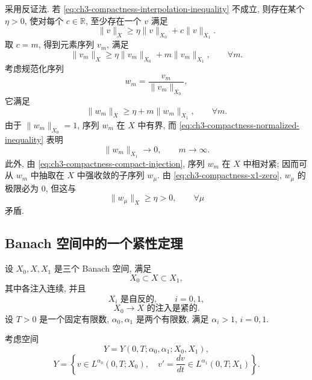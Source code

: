 \begin{Proof}
采用反证法. 若 \eqref{eq:ch3-compactness-interpolation-inequality} 不成立, 则存在某个 $\eta>0$, 使对每个 $c\in\mathbb R$, 至少存在一个 $v$ 满足
\[
\lVert v\rVert_X\geq \eta\lVert v\rVert_{X_0}+c\lVert v\rVert_{X_1}.
\]
取 $c=m$, 得到元素序列 $v_m$, 满足
\[
\lVert v_m\rVert_X\geq \eta\lVert v_m\rVert_{X_0}+m\lVert v_m\rVert_{X_1},
\qquad\forall m.
\]
考虑规范化序列
\[
w_m=\frac{v_m}{\lVert v_m\rVert_{X_0}},
\]
它满足
\begin{equation}
\lVert w_m\rVert_X\geq\eta+m\lVert w_m\rVert_{X_1},
\qquad\forall m.
\label{eq:ch3-compactness-normalized-inequality}
\end{equation}
由于 $\lVert w_m\rVert_{X_0}=1$, 序列 $w_m$ 在 $X$ 中有界, 而 \eqref{eq:ch3-compactness-normalized-inequality} 表明
\begin{equation}
\lVert w_m\rVert_{X_1}\longrightarrow0,
\qquad m\to\infty.
\label{eq:ch3-compactness-x1-zero}
\end{equation}
此外, 由 \eqref{eq:ch3-compactness-compact-injection}, 序列 $w_m$ 在 $X$ 中相对紧; 因而可从 $w_m$ 中抽取在 $X$ 中强收敛的子序列 $w_\mu$. 由 \eqref{eq:ch3-compactness-x1-zero}, $w_\mu$ 的极限必为 $0$, 但这与
\[
\lVert w_\mu\rVert_X\geq\eta>0,
\qquad\forall\mu
\]
矛盾.
\end{Proof}

\subsection{Banach 空间中的一个紧性定理}
\label{subsec:ch3-compactness-banach}
设 $X_0,X,X_1$ 是三个 Banach 空间, 满足
\begin{equation}
X_0\subset X\subset X_1,
\label{eq:ch3-compactness-banach-chain}
\end{equation}
其中各注入连续, 并且
\begin{equation}
X_i\text{ 是自反的},\qquad i=0,1,
\label{eq:ch3-compactness-reflexive-spaces}
\end{equation}
\begin{equation}
X_0\longrightarrow X\text{ 的注入是紧的}.
\label{eq:ch3-compactness-banach-compact-injection}
\end{equation}
设 $T>0$ 是一个固定有限数, $\alpha_0,\alpha_1$ 是两个有限数, 满足 $\alpha_i>1$, $i=0,1$.

考虑空间
\begin{equation}
Y=Y(0,T;\alpha_0,\alpha_1;X_0,X_1),
\label{eq:ch3-compactness-y-space}
\end{equation}
\begin{equation}
Y=\left\{v\in L^{\alpha_0}(0,T;X_0),\quad
v'=\frac{dv}{dt}\in L^{\alpha_1}(0,T;X_1)\right\}.
\label{eq:ch3-compactness-y-definition}
\end{equation}

